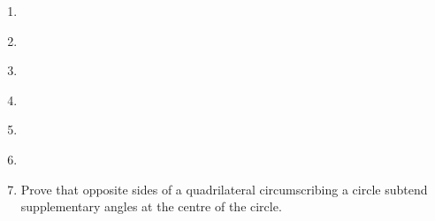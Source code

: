 \begin{enumerate}[label=\thesection.\arabic*,ref=\thesection.\theenumi]
\item 
\label{chapters/10/10/2/7}

\item 
\label{chapters/10/10/2/8}

\item 
\label{chapters/10/10/2/9}

\item 
\label{chapters/10/10/2/10}

\item 
%
\item 
\label{chapters/10/10/2/12}

 \item Prove that opposite sides of a quadrilateral circumscribing a circle 
    subtend supplementary angles at the centre of the circle.
\label{chapters/10/10/2/13}
\\
       \solution 


\end{enumerate}
